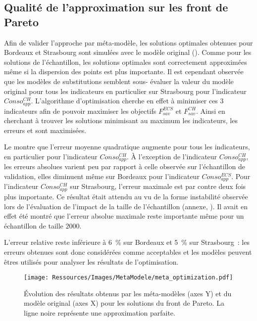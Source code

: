 \subsection{Qualité de l’approximation sur les front de Pareto} %
\label{sub:qualite_de_l_approximation_sur_les_front_de_pareto}
Afin de valider l’approche par méta-modèle, les solutions optimales obtenues pour Bordeaux
et Strasbourg sont simulées avec le modèle original ().
Comme pour les solutions de l’échantillon, les solutions optimales sont correctement
approximées même si la dispersion des points est plus importante. Il est cependant
observée que les modèles de substitutions semblent sous- évaluer la valeur du modèle
original pour tous les indicateurs en particulier sur Strasbourg pour l’indicateur
$Conso_{app}^{CH}$. L’algorithme d’optimisation cherche en effet à minimiser ces $3$
indicateurs afin de pouvoir maximiser les objectifs $F_{sav}^{ECS}$ et $F_{sav}^{CH}$.
Ainsi en cherchant à trouver les solutions minimisant au maximum les indicateurs, les
erreurs  et  sont maximisées.

Le  montre que l’erreur moyenne quadratique augmente pour
tous les indicateurs, en particulier pour l’indicateur $Conso_{app}^{CH}$. À l’exception
de l’indicateur $Conso_{app}^{CH}$, les erreurs absolues varient peu par rapport à celle
observée sur l’échantillon de validation, elles diminuent même sur Bordeaux pour
l’indicateur $Conso_{app}^{ECS}$. Pour l’indicateur $Conso_{app}^{CH}$ sur Strasbourg,
l’erreur maximale est par contre deux fois plus importante. Ce résultat était attendu au
vu de la forme instabilité observée lors de l’évaluation de l’impact de la taille de
l’échantillon (annexe, ). Il avait en effet été montré que l’erreur
absolue maximale reste importante même pour un échantillon de taille $2000$.

L’erreur relative reste inférieure à \SI{6}{\percent} sur Bordeaux et
\SI{5}{\percent} sur Strasbourg~: les erreurs obtenues sont donc considérées
comme acceptables et les modèles peuvent êtres utilisés pour analyser les résultats de
l’optimisation.


\begin{figure}
    \centering
    \texttt{[image: Ressources/Images/MetaModele/meta\_optimization.pdf]}
    \caption[Évaluation de la précision des méta-modèles pour les solutions optimales]
            {Évolution des résultats obtenus par les méta-modèles (axes Y) et du modèle
             original (axes X) pour les solutions du front de Pareto.
             La ligne noire représente une approximation parfaite.}
    \label{fig:validite_meta_ssc_optimisation}
\end{figure}


